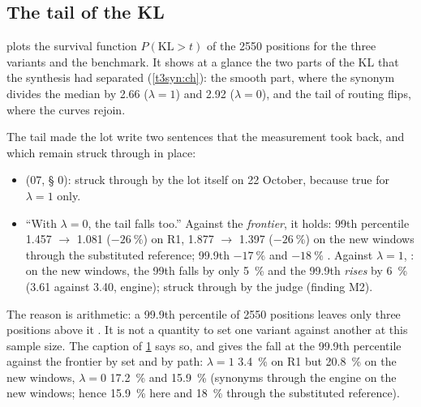 \subsection{The tail of the KL}\label{t3sno:sec:queue}

 plots the survival function $P(\mathrm{KL} > t)$ of the \num{2550} positions for the three variants and the benchmark. It shows at a glance the two parts of the KL that the synthesis had separated (\cref{t3syn:ch}): the smooth part, where the synonym divides the median by \num{2.66} ($\lambda = 1$) and \num{2.92} ($\lambda = 0$), and the tail of routing flips, where the curves rejoin.

\begin{figure}[tbp]
\centering
\GrapheSynoQueue
{}
\label{fig:t3-syno-queue}
\end{figure}

The tail made the lot write two sentences that the measurement took back, and which remain struck through in place:
\begin{itemize}
\item {} (07, § 0): struck through by the lot itself on 22 October, because true for $\lambda = 1$ only.
\item ``With $\lambda = 0$, the tail falls too.'' Against the \emph{frontier}, it holds: 99th percentile \num{1.457} $\to$ \num{1.081} ($-\SI{26}{\percent}$) on R1, \num{1.877} $\to$ \num{1.397} ($-\SI{26}{\percent}$) on the new windows through the substituted reference; 99.9th $-\SI{17}{\percent}$ and $-\SI{18}{\percent}$ \mes. Against $\lambda = 1$, : on the new windows, the 99th falls by only \SI{5}{\percent} and the 99.9th \emph{rises} by \SI{6}{\percent} (\num{3.61} against \num{3.40}, engine); struck through by the judge (finding M2).
\end{itemize}
The reason is arithmetic: a 99.9th percentile of \num{2550} positions leaves only three positions above it \calc. It is not a quantity to set one variant against another at this sample size. The caption of \cref{fig:t3-syno-queue} says so, and gives the fall at the 99.9th percentile against the frontier by set and by path: $\lambda = 1$ \SI{3.4}{\percent} on R1 but \SI{20.8}{\percent} on the new windows, $\lambda = 0$ \SI{17.2}{\percent} and \SI{15.9}{\percent} (synonyms through the engine on the new windows; hence \SI{15.9}{\percent} here and \SI{18}{\percent} through the substituted reference).

